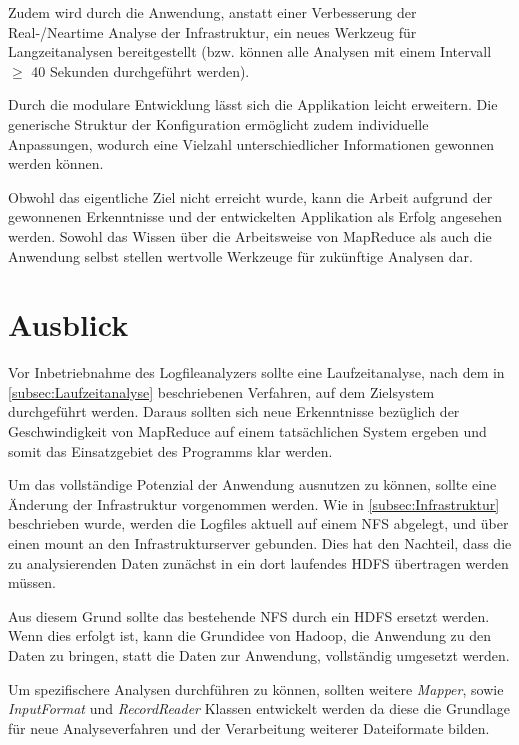 Zudem wird durch die Anwendung, anstatt einer Verbesserung der Real-/Neartime Analyse der Infrastruktur, ein neues Werkzeug für Langzeitanalysen bereitgestellt (bzw. können alle Analysen mit einem Intervall $\geq$ 40 Sekunden durchgeführt werden).

Durch die modulare Entwicklung lässt sich die Applikation leicht erweitern. Die generische Struktur der Konfiguration ermöglicht zudem individuelle Anpassungen, wodurch eine Vielzahl unterschiedlicher Informationen gewonnen werden können.

Obwohl das eigentliche Ziel nicht erreicht wurde, kann die Arbeit aufgrund der gewonnenen Erkenntnisse und der entwickelten Applikation als Erfolg angesehen werden. Sowohl das Wissen über die Arbeitsweise von MapReduce als auch die Anwendung selbst stellen wertvolle Werkzeuge für zukünftige Analysen dar.


\section{Ausblick}\label{sec:Ausblick}
Vor Inbetriebnahme des Logfileanalyzers sollte eine Laufzeitanalyse, nach dem in \autoref{subsec:Laufzeitanalyse} beschriebenen Verfahren, auf dem Zielsystem durchgeführt werden. Daraus sollten sich neue Erkenntnisse bezüglich der Geschwindigkeit von MapReduce auf einem tatsächlichen System ergeben und somit das Einsatzgebiet des Programms klar werden.

Um das vollständige Potenzial der Anwendung ausnutzen zu können, sollte eine Änderung der Infrastruktur vorgenommen werden. Wie in \autoref{subsec:Infrastruktur} beschrieben wurde, werden die Logfiles aktuell auf einem \ac{NFS} abgelegt, und über einen mount an den Infrastrukturserver gebunden. Dies hat den Nachteil, dass die zu analysierenden Daten zunächst in ein dort laufendes \ac{HDFS} übertragen werden müssen.

Aus diesem Grund sollte das bestehende \ac{NFS} durch ein \ac{HDFS} ersetzt werden. Wenn dies erfolgt ist, kann die Grundidee von Hadoop, die Anwendung zu den Daten zu bringen, statt die Daten zur Anwendung, vollständig umgesetzt werden.

Um spezifischere Analysen durchführen zu können, sollten weitere \textit{Mapper}, sowie \textit{InputFormat} und \textit{RecordReader} Klassen entwickelt werden da diese die Grundlage für neue Analyseverfahren und der Verarbeitung weiterer Dateiformate bilden.

